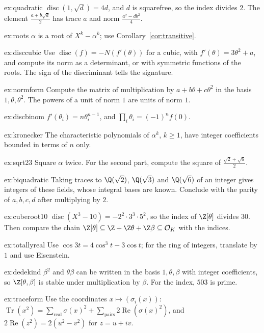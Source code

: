 \begin{hint}{ex:quadratic}
$\operatorname{disc}(1,\sqrt d)=4d$, and $d$ is squarefree, so the index divides $2$. The element
$\frac{a+b\sqrt d}2$ has trace $a$ and norm $\frac{a^2-db^2}4$.
\end{hint}
\begin{hint}{ex:roots}
$\alpha$ is a root of $X^k-\alpha^k$; use Corollary~\ref{cor:transitive}.
\end{hint}
\begin{hint}{ex:disccubic}
Use $\operatorname{disc}(f)=-N(f'(\theta))$ for a cubic, with $f'(\theta)=3\theta^2+a$, and compute its norm as a
determinant, or with symmetric functions of the roots. The sign of the discriminant tells the signature.
\end{hint}
\begin{hint}{ex:normform}
Compute the matrix of multiplication by $a+b\theta+c\theta^2$ in the basis $1,\theta,\theta^2$. The powers of a unit of
norm $1$ are units of norm $1$.
\end{hint}
\begin{hint}{ex:discbinom}
$f'(\theta_i)=n\theta_i^{n-1}$, and $\prod_i\theta_i=(-1)^nf(0)$.
\end{hint}
\begin{hint}{ex:kronecker}
The characteristic polynomials of $\alpha^k$, $k\ge1$, have integer coefficients bounded in terms of $n$ only.
\end{hint}
\begin{hint}{ex:sqrt23}
Square $\alpha$ twice. For the second part, compute the square of $\frac{\sqrt2+\sqrt6}2$.
\end{hint}
\begin{hint}{ex:biquadratic}
Taking traces to $\Q(\sqrt2)$, $\Q(\sqrt3)$ and $\Q(\sqrt6)$ of an integer gives integers of these fields, whose
integral bases are known. Conclude with the parity of $a,b,c,d$ after multiplying by $2$.
\end{hint}
\begin{hint}{ex:cuberoot10}
$\operatorname{disc}(X^3-10)=-2^2\cdot3^3\cdot5^2$, so the index of $\Z[\theta]$ divides $30$. Then compare the chain
$\Z[\theta]\subseteq\Z+\Z\theta+\Z\beta\subseteq\mathcal O_K$ with the indices.
\end{hint}
\begin{hint}{ex:totallyreal}
Use $\cos3t=4\cos^3t-3\cos t$; for the ring of integers, translate by $1$ and use Eisenstein.
\end{hint}
\begin{hint}{ex:dedekind}
$\beta^2$ and $\theta\beta$ can be written in the basis $1,\theta,\beta$ with integer coefficients, so
$\Z[\theta,\beta]$ is stable under multiplication by $\beta$. For the index, $503$ is prime.
\end{hint}
\begin{hint}{ex:traceform}
Use the coordinates $x\mapsto(\sigma_i(x))$: $\operatorname{Tr}(x^2)=\sum_{\text{real}}\sigma(x)^2+
\sum_{\text{pairs}}2\operatorname{Re}(\sigma(x)^2)$, and $2\operatorname{Re}(z^2)=2(u^2-v^2)$ for $z=u+iv$.
\end{hint}

